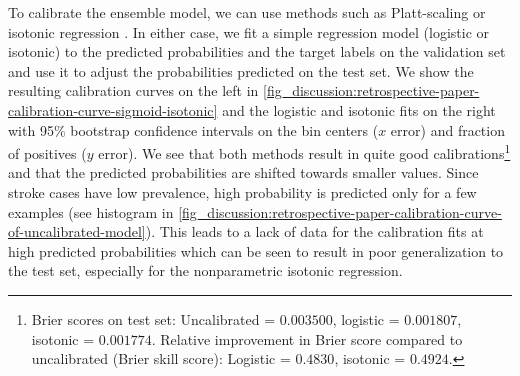 To calibrate the ensemble model, we can use methods such as Platt-scaling \parencite{platt_probabilistic_1999} or isotonic regression \parencite{zadrozny_transforming_2002}. 
In either case, we fit a simple regression model (logistic or isotonic) to the predicted probabilities and the target labels on the validation set and use it to adjust the probabilities predicted on the test set. We show the resulting calibration curves on the left in \cref{fig_discussion:retrospective-paper-calibration-curve-sigmoid-isotonic} and the logistic and isotonic fits on the right with 95\% bootstrap confidence intervals on the bin centers ($x$ error) and fraction of positives ($y$ error). 
We see that both methods result in quite good calibrations\footnote{Brier scores on test set: Uncalibrated = $0.003500$, logistic = $0.001807$, isotonic = $0.001774$. Relative improvement in Brier score compared to uncalibrated (Brier skill score): Logistic = $0.4830$, isotonic = $0.4924$.} and that the predicted probabilities are shifted towards smaller values. 
Since stroke cases have low prevalence, high probability is predicted only for a few examples (see histogram in \cref{fig_discussion:retrospective-paper-calibration-curve-of-uncalibrated-model}). This leads to a lack of data for the calibration fits at high predicted probabilities which can be seen to result in poor generalization to the test set, especially for the nonparametric isotonic regression.


